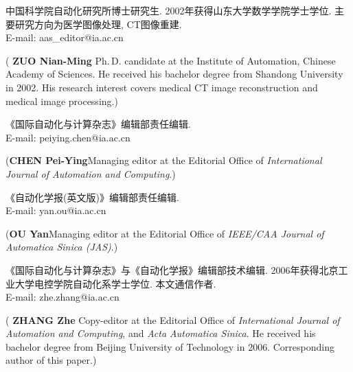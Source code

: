 \documentclass{Style/aas}
\begin{document}
\begin{multicols}{2}
  \begin{biography}
    \quad
    中国科学院自动化研究所博士研究生.
    2002年获得山东大学数学学院学士学位.
    主要研究方向为医学图像处理, CT图像重建.\\E-mail: aas\_editor@ia.ac.cn

    \noindent({\bf
      ZUO Nian-Ming
    }\quad
    Ph.\,D. candidate at the
    Institute of Automation, Chinese Academy of Sciences. He received
    his bachelor degree from Shandong University in 2002. His research
    interest covers medical CT image reconstruction and medical image
    processing.)
  \end{biography}

  \begin{biographynophoto}
    \quad 《国际自动化与计算杂志》编辑部责任编辑.\\E-mail: peiying.chen@ia.ac.cn

    \noindent({\bf CHEN Pei-Ying}\quad Managing editor at the Editorial Office of
    {\sl International Journal of Automation and Computing}.)
  \end{biographynophoto}

  \begin{biographynophoto}
    \quad 《自动化学报(英文版)》编辑部责任编辑.\\E-mail: yan.ou@ia.ac.cn

    \noindent({\bf OU Yan}\quad Managing editor at the Editorial Office of
      {\sl IEEE/CAA Journal of Automatica Sinica (JAS)}.)
  \end{biographynophoto}

  \begin{biography}
    \quad
    《国际自动化与计算杂志》与《自动化学报》编辑部技术编辑. 2006年获得北京工业大学电控学院自动化系学士学位.
    本文通信作者.\\E-mail: zhe.zhang@ia.ac.cn

    \noindent({\bf
      ZHANG Zhe
    }\quad
    Copy-editor at the Editorial Office of
    {\sl International Journal of Automation and Computing}, and {\sl
      Acta Automatica Sinica}. He received his bachelor degree from Beijing
    University of Technology in 2006. Corresponding author of this paper.)
  \end{biography}
\end{multicols}
\end{document}
